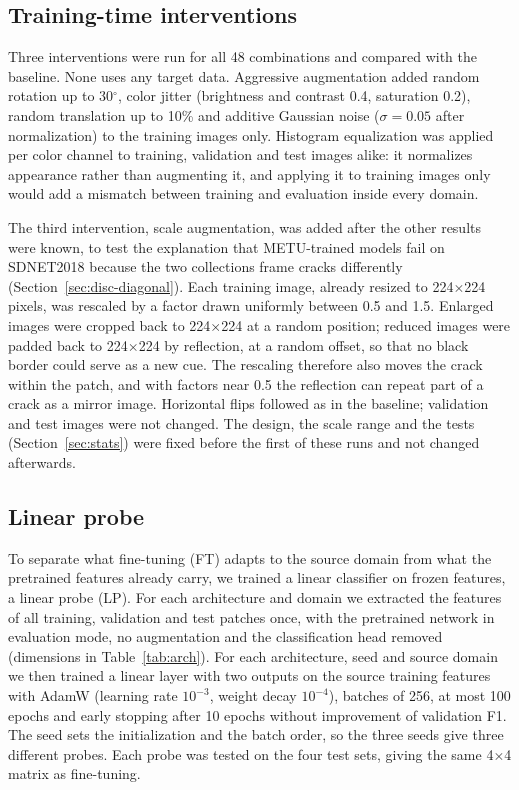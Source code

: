 \documentclass[pdflatex,sn-apa]{sn-jnl}
\begin{document}
\subsection{Training-time interventions}\label{sec:interventions}

Three interventions were run for all 48 combinations and compared with the baseline. None uses any target data. Aggressive augmentation added random rotation up to 30$^\circ$, color jitter (brightness and contrast 0.4, saturation 0.2), random translation up to 10\% and additive Gaussian noise ($\sigma=0.05$ after normalization) to the training images only. Histogram equalization was applied per color channel to training, validation and test images alike: it normalizes appearance rather than augmenting it, and applying it to training images only would add a mismatch between training and evaluation inside every domain.

The third intervention, scale augmentation, was added after the other results were known, to test the explanation that METU-trained models fail on SDNET2018 because the two collections frame cracks differently (Section~\ref{sec:disc-diagonal}). Each training image, already resized to 224$\times$224 pixels, was rescaled by a factor drawn uniformly between 0.5 and 1.5. Enlarged images were cropped back to 224$\times$224 at a random position; reduced images were padded back to 224$\times$224 by reflection, at a random offset, so that no black border could serve as a new cue. The rescaling therefore also moves the crack within the patch, and with factors near 0.5 the reflection can repeat part of a crack as a mirror image. Horizontal flips followed as in the baseline; validation and test images were not changed. The design, the scale range and the tests (Section~\ref{sec:stats}) were fixed before the first of these runs and not changed afterwards.

\subsection{Linear probe}\label{sec:probe}

To separate what fine-tuning (FT) adapts to the source domain from what the pretrained features already carry, we trained a linear classifier on frozen features, a linear probe (LP). For each architecture and domain we extracted the features of all training, validation and test patches once, with the pretrained network in evaluation mode, no augmentation and the classification head removed (dimensions in Table~\ref{tab:arch}). For each architecture, seed and source domain we then trained a linear layer with two outputs on the source training features with AdamW (learning rate $10^{-3}$, weight decay $10^{-4}$), batches of 256, at most 100 epochs and early stopping after 10 epochs without improvement of validation F1. The seed sets the initialization and the batch order, so the three seeds give three different probes. Each probe was tested on the four test sets, giving the same 4$\times$4 matrix as fine-tuning.
\end{document}
